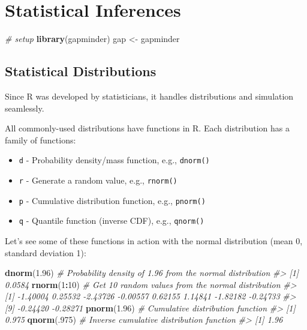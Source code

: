 \documentclass[
]{book}
\newenvironment{Shaded}{\begin{snugshade}}{\end{snugshade}}
\newcommand{\CommentTok}[1]{\textcolor[rgb]{0.56,0.35,0.01}{\textit{#1}}}
\newcommand{\DecValTok}[1]{\textcolor[rgb]{0.00,0.00,0.81}{#1}}
\newcommand{\FloatTok}[1]{\textcolor[rgb]{0.00,0.00,0.81}{#1}}
\newcommand{\KeywordTok}[1]{\textcolor[rgb]{0.13,0.29,0.53}{\textbf{#1}}}
\newcommand{\NormalTok}[1]{#1}
\newcommand{\OperatorTok}[1]{\textcolor[rgb]{0.81,0.36,0.00}{\textbf{#1}}}
\newcommand{\StringTok}[1]{\textcolor[rgb]{0.31,0.60,0.02}{#1}}
\providecommand{\tightlist}{%
  \setlength{\itemsep}{0pt}\setlength{\parskip}{0pt}}
\begin{document}
\hypertarget{statistical-inferences}{%
\chapter{Statistical Inferences}\label{statistical-inferences}}

\begin{Shaded}
\begin{Highlighting}[]
\CommentTok{# setup}
\KeywordTok{library}\NormalTok{(gapminder)}
\NormalTok{gap <-}\StringTok{ }\NormalTok{gapminder}
\end{Highlighting}
\end{Shaded}

\hypertarget{statistical-distributions}{%
\section{Statistical Distributions}\label{statistical-distributions}}

Since R was developed by statisticians, it handles distributions and simulation seamlessly.

All commonly-used distributions have functions in R. Each distribution has a family of functions:

\begin{itemize}
\tightlist
\item
  \texttt{d} - Probability density/mass function, e.g., \texttt{dnorm()}
\item
  \texttt{r} - Generate a random value, e.g., \texttt{rnorm()}
\item
  \texttt{p} - Cumulative distribution function, e.g., \texttt{pnorm()}
\item
  \texttt{q} - Quantile function (inverse CDF), e.g., \texttt{qnorm()}
\end{itemize}

Let's see some of these functions in action with the normal distribution (mean 0, standard deviation 1):

\begin{Shaded}
\begin{Highlighting}[]
\KeywordTok{dnorm}\NormalTok{(}\FloatTok{1.96}\NormalTok{) }\CommentTok{# Probability density of 1.96 from the normal distribution}
\CommentTok{#> [1] 0.0584}
\KeywordTok{rnorm}\NormalTok{(}\DecValTok{1}\OperatorTok{:}\DecValTok{10}\NormalTok{) }\CommentTok{# Get 10 random values from the normal distribution}
\CommentTok{#>  [1] -1.40004  0.25532 -2.43726 -0.00557  0.62155  1.14841 -1.82182 -0.24733}
\CommentTok{#>  [9] -0.24420 -0.28271}
\KeywordTok{pnorm}\NormalTok{(}\FloatTok{1.96}\NormalTok{) }\CommentTok{# Cumulative distribution function}
\CommentTok{#> [1] 0.975}
\KeywordTok{qnorm}\NormalTok{(.}\DecValTok{975}\NormalTok{) }\CommentTok{# Inverse cumulative distribution function}
\CommentTok{#> [1] 1.96}
\end{Highlighting}
\end{Shaded}
\end{document}
